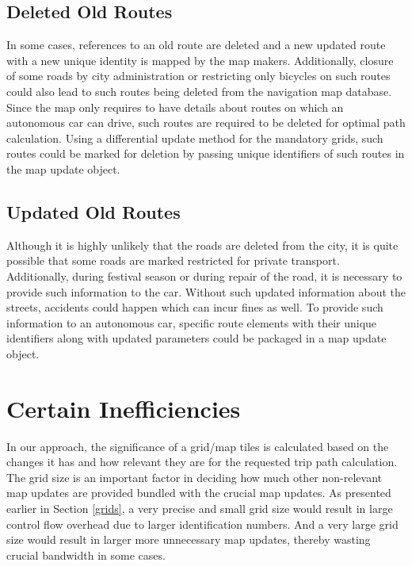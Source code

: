 \subsection{Deleted Old Routes}
In some cases, references to an old route are deleted and a new updated route with a new unique identity is mapped by the map makers. Additionally, closure of some roads by city administration or restricting only bicycles on such routes could also lead to such routes being deleted from the navigation map database. Since the map only requires to have details about routes on which an autonomous car can drive, such routes are required to be deleted for optimal path calculation. Using a differential update method for the mandatory grids, such routes could be marked for deletion by passing unique identifiers of such routes in the map update object. 
\subsection{Updated Old Routes}
Although it is highly unlikely that the roads are deleted from the city, it is quite possible that some roads are marked restricted for private transport. Additionally, during festival season or during repair of the road, it is necessary to provide such information to the car. Without such updated information about the streets, accidents could happen which can incur fines as well. To provide such information to an autonomous car, specific route elements with their unique identifiers along with updated parameters could be packaged in a map update object. 
\section{Certain Inefficiencies}
In our approach, the significance of a grid/map tiles is calculated based on the changes it has and how relevant they are for the requested trip path calculation. The grid size is an important factor in deciding how much other non-relevant map updates are provided bundled with the crucial map updates. As presented earlier in Section \ref{grids}, a very precise and small grid size would result in large control flow overhead due to larger identification numbers. And a very large grid size would result in larger more unnecessary map updates, thereby wasting crucial bandwidth in some cases. 
